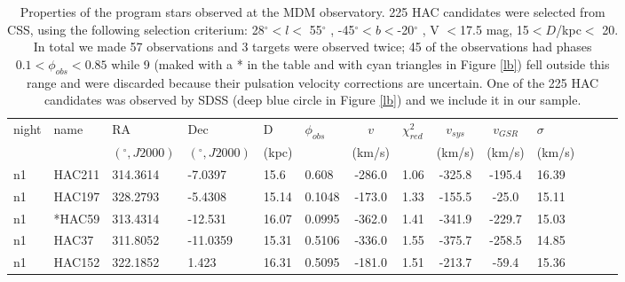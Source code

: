 \documentclass[useAMS,usenatbib]{mn2e}
\begin{document}


\setcounter{table}{1}
\begin{table*}
 \centering
 \hspace*{-1.cm}
 \begin{minipage}{150mm}
   \caption[Properties of the Program stars]{Properties of the program stars observed at the MDM observatory. 225 HAC candidates were selected from CSS, using the following selection criterium: 28$^{\circ}$$<l<$ 55$^{\circ}$ , -45$^{\circ}$$< b <$-20$^{\circ}$ , V $< $17.5 mag, 15$ <  D$/kpc$ <$ 20. In total we made 57 observations and 3 targets were observed twice; 45 of the observations had phases $0.1 < \phi_{obs} < 0.85$ while 9 (maked with a * in the table and with cyan triangles in Figure \ref{lb}) fell outside this range and were discarded because their pulsation velocity corrections are uncertain. One of the 225 HAC candidates was observed by SDSS (deep blue circle in Figure \ref{lb}) and we include it in our sample. }
   \label{resultsMDM}
  \begin{tabular}{@{}llllllclccllll@{}}
 \hline
  night &  name &   RA &   Dec & D & $ \phi_{obs}$ & $v$ & $\chi_{red}^{2}$ & $v_{sys}$ & $v_{GSR}$ &$\sigma$ &  \\
    &   & $ (^{\circ}, J2000) $ & $ (^{\circ}, J2000) $ & (kpc) &  &  (km/s) &  & (km/s) & (km/s) & (km/s) &  \\
 \hline
n1 & HAC211 & 314.3614 & -7.0397 & 15.6 & 0.608 & -286.0 & 1.06 & -325.8 & -195.4 & 16.39 \\
n1 & HAC197 & 328.2793 & -5.4308 & 15.14 & 0.1048 & -173.0 & 1.33 & -155.5 & -25.0 & 15.11 \\
n1 & *HAC59 & 313.4314 & -12.531 & 16.07 & 0.0995 & -362.0 & 1.41 & -341.9 & -229.7 & 15.03 \\
n1 & HAC37 & 311.8052 & -11.0359 & 15.31 & 0.5106 & -336.0 & 1.55 & -375.7 & -258.5 & 14.85 \\
n1 & HAC152 & 322.1852 & 1.423 & 16.31 & 0.5095 & -181.0 & 1.51 & -213.7 & -59.4 & 15.36 \\

\end{tabular}
\end{minipage}
\end{table*}
\end{document}
